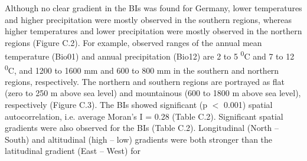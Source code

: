 Although no clear gradient in the BIs was found for Germany, lower temperatures and higher precipitation were mostly observed in the southern regions, whereas higher temperatures and lower precipitation were mostly observed in the northern regions (Figure C.2). For example, observed ranges of the annual mean temperature (Bio01) and annual precipitation (Bio12) are 2 to 5 \textsuperscript{0}C and 7 to 12 \textsuperscript{0}C, and 1200 to 1600 mm and 600 to 800 mm in the southern and northern regions, respectively. The northern and southern regions are portrayed as flat (zero to 250 m above sea level) and mountainous (600 to 1800 m above sea level), respectively (Figure C.3).  The BIs showed significant (p $<$ 0.001) spatial autocorrelation, i.e. average Moran's I = 0.28 (Table C.2). Significant spatial gradients were also observed for the BIs (Table C.2). Longitudinal (North – South) and altitudinal (high – low) gradients were both stronger than the latitudinal gradient (East – West) for

